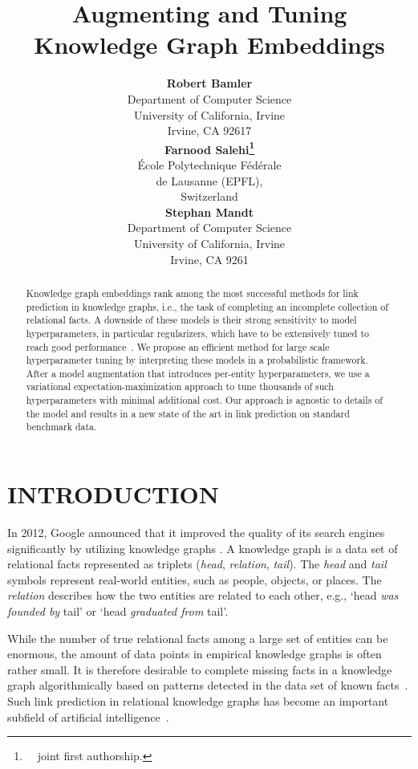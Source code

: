 \documentclass[letterpage]{article}
\title{Augmenting and Tuning Knowledge Graph Embeddings}
\author{
{\bf Robert Bamler}  \\
Department of Computer Science \\
University of California, Irvine \\
Irvine, CA 92617 \\
\And
{\bf Farnood Salehi\thanks{~~joint first authorship.}} \\
\'Ecole Polytechnique F\'ed\'erale \\
de Lausanne (EPFL), \\
Switzerland \\
\And
{\bf Stephan Mandt}   \\
Department of Computer Science \\
University of California, Irvine \\
Irvine, CA 9261
}
\begin{document}
\maketitle

\begin{abstract}
Knowledge graph embeddings rank among the most successful methods for link prediction in knowledge graphs, i.e., the task of completing an incomplete collection of relational facts.
A downside of these models is their strong sensitivity to model hyperparameters, in particular regularizers, which have to be extensively tuned to reach good performance~\citep{KBK2017}. We propose an efficient method for large scale hyperparameter tuning by interpreting these models in a probabilistic framework. After a model augmentation that introduces per-entity hyperparameters, we use a variational expectation-maximization approach to tune thousands of such hyperparameters with minimal additional cost. Our approach is agnostic to details of the model and results in a new state of the art in link prediction on standard benchmark data.
\end{abstract}

\section{INTRODUCTION}\label{sec:introduction}

In 2012, Google announced that it improved the quality of its search engines significantly by utilizing knowledge graphs \citep{E2012}.
A knowledge graph is a data set of relational facts represented as triplets (\emph{head}, \emph{relation}, \emph{tail}).
The \emph{head} and \emph{tail} symbols represent real-world entities, such as people, objects, or places.
The \emph{relation} describes how the two entities are related to each other, e.g., `head \emph{was founded by} tail' or `head \emph{graduated from} tail'.

While the number of true relational facts among a large set of entities can be enormous, the amount of data points in empirical knowledge graphs is often rather small.
It is therefore desirable to complete missing facts in a knowledge graph algorithmically based on patterns detected in the data set of known facts~\citep{nickel2016review}.
Such link prediction in relational knowledge graphs has become an important subfield of artificial intelligence~\citep{BUGWY2013,WZFC2014,LLSLZ2015,NRP2016,TWR2016,WL2016,JLHZ2016,SHCG2016,XHMZ2017,SW2017,LUO2018}.
\end{document}
